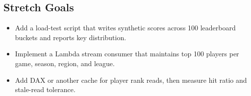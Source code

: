 \subsection*{Stretch Goals}
\begin{itemize}
    \item Add a load-test script that writes synthetic scores across 100 leaderboard buckets and reports key distribution.
    \item Implement a Lambda stream consumer that maintains top 100 players per game, season, region, and league.
    \item Add DAX or another cache for player rank reads, then measure hit ratio and stale-read tolerance.
\end{itemize}
